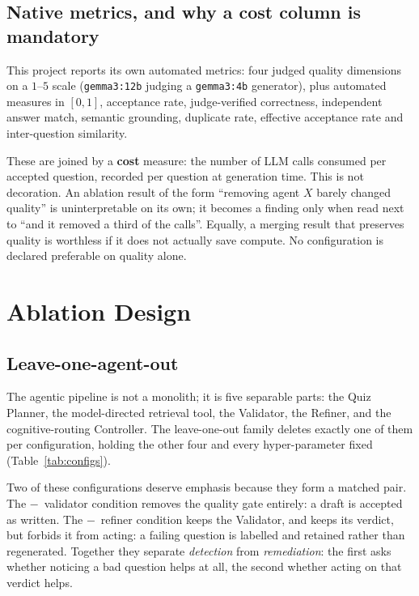 \subsection{Native metrics, and why a cost column is mandatory}
\label{sec:res-proto-native}

This project reports its own automated
metrics: four judged quality dimensions on a $1$--$5$ scale
(\texttt{gemma3:12b} judging a \texttt{gemma3:4b} generator), plus automated
measures in $[0,1]$, acceptance rate, judge-verified correctness, independent
answer match, semantic grounding, duplicate rate, effective acceptance rate
and inter-question similarity.

These are joined by a \textbf{cost} measure: the number of LLM calls consumed
per accepted question, recorded per question at generation time. This is not decoration. An ablation
result of the form ``removing agent $X$ barely changed quality'' is
uninterpretable on its own; it becomes a finding only when read next to
``and it removed a third of the calls''. Equally, a merging result that
preserves quality is worthless if it does not actually save compute. No configuration is declared preferable on quality alone.

\section{Ablation Design}
\label{sec:res-ablation}

\subsection{Leave-one-agent-out}
\label{sec:res-loo}

The agentic pipeline is not a monolith; it is five separable parts: the Quiz
Planner, the model-directed retrieval tool, the Validator, the Refiner, and
the cognitive-routing Controller. The leave-one-out family deletes exactly one
of them per configuration, holding the other four and every hyper-parameter
fixed (Table~\ref{tab:configs}).

Two of these configurations deserve emphasis because they form a matched pair.
The $-$\, validator condition removes the quality gate entirely: a draft is
accepted as written. The $-$\, refiner condition keeps the Validator, and keeps
its verdict, but forbids it from acting: a failing question is labelled and
retained rather than regenerated. Together they separate \emph{detection} from
\emph{remediation}: the first asks whether noticing a bad question helps at all,
the second whether acting on that verdict helps.

